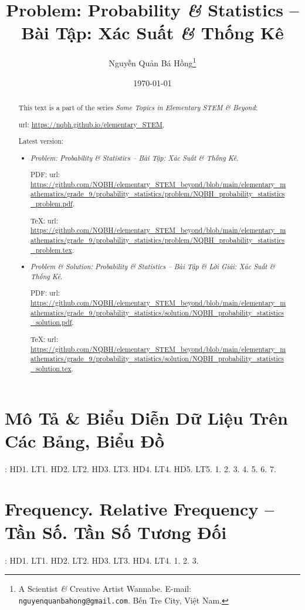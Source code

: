 \documentclass{article}
\title{Problem: Probability {\it\&} Statistics -- Bài Tập: Xác Suất {\it\&} Thống Kê}
\author{Nguyễn Quản Bá Hồng\footnote{A Scientist {\it\&} Creative Artist Wannabe. E-mail: {\tt nguyenquanbahong@gmail.com}. Bến Tre City, Việt Nam.}}
\date{\today}
\begin{document}
\maketitle
\begin{abstract}
	This text is a part of the series {\it Some Topics in Elementary STEM \& Beyond}:
	
	{\sc url}: \url{https://nqbh.github.io/elementary_STEM}.
	
	Latest version:
	\begin{itemize}
		\item {\it Problem: Probability \& Statistics -- Bài Tập: Xác Suất \& Thống Kê}.
		
		PDF: {\sc url}: \url{https://github.com/NQBH/elementary_STEM_beyond/blob/main/elementary_mathematics/grade_9/probability_statistics/problem/NQBH_probability_statistics_problem.pdf}.
		
		\TeX: {\sc url}: \url{https://github.com/NQBH/elementary_STEM_beyond/blob/main/elementary_mathematics/grade_9/probability_statistics/problem/NQBH_probability_statistics_problem.tex}.
		\item {\it Problem \& Solution: Probability \& Statistics -- Bài Tập \& Lời Giải: Xác Suất \& Thống Kê}.
		
		PDF: {\sc url}: \url{https://github.com/NQBH/elementary_STEM_beyond/blob/main/elementary_mathematics/grade_9/probability_statistics/solution/NQBH_probability_statistics_solution.pdf}.
		
		\TeX: {\sc url}: \url{https://github.com/NQBH/elementary_STEM_beyond/blob/main/elementary_mathematics/grade_9/probability_statistics/solution/NQBH_probability_statistics_solution.tex}.
	\end{itemize}
\end{abstract}
\tableofcontents


\section{Mô Tả \& Biểu Diễn Dữ Liệu Trên Các Bảng, Biểu Đồ}
\cite[Chap. VI, \S1, pp. 3--15]{SGK_Toan_9_Canh_Dieu_tap_2}: HD1. LT1. HD2. LT2. HD3. LT3. HD4. LT4. HD5. LT5. 1. 2. 3. 4. 5. 6. 7.


\section{Frequency. Relative Frequency -- Tần Số. Tần Số Tương Đối}
\cite[Chap. VI, \S2, pp. 16--23]{SGK_Toan_9_Canh_Dieu_tap_2}: HD1. LT1. HD2. LT2. HD3. LT3. HD4. LT4. 1. 2. 3.
\end{document}
